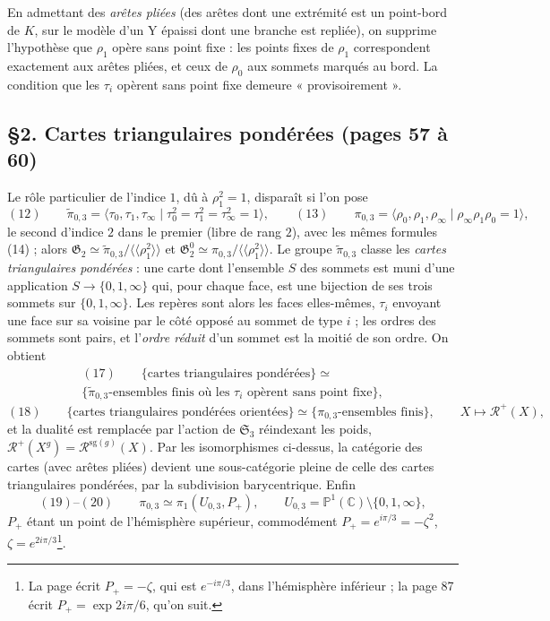 \documentclass[11pt,a4paper]{article}
\begin{document}
En admettant des \emph{arêtes pliées} (des arêtes dont une extrémité est un
point-bord de $K$, sur le modèle d'un Y épaissi dont une branche est repliée),
on supprime l'hypothèse que $\rho_1$ opère sans point fixe : les points fixes
de $\rho_1$ correspondent exactement aux arêtes pliées, et ceux de $\rho_0$ aux
sommets marqués au bord. La condition que les $\tau_i$ opèrent sans point fixe
demeure « provisoirement ».

\subsection*{§2. Cartes triangulaires pondérées (pages 57 à 60)}

Le rôle particulier de l'indice $1$, dû à $\rho_1^2 = 1$, disparaît si l'on
pose
\[
(12)\qquad \tilde\pi_{0,3} = \langle \tau_0, \tau_1, \tau_\infty \mid \tau_0^2 = \tau_1^2 = \tau_\infty^2 = 1 \rangle,
\qquad
(13)\qquad \pi_{0,3} = \langle \rho_0, \rho_1, \rho_\infty \mid \rho_\infty\rho_1\rho_0 = 1 \rangle,
\]
le second d'indice $2$ dans le premier (libre de rang $2$), avec les mêmes
formules (14) ; alors $\mathfrak{G}_2 \simeq \tilde\pi_{0,3}/\langle\langle\rho_1^2\rangle\rangle$
et $\mathfrak{G}^0_2 \simeq \pi_{0,3}/\langle\langle\rho_1^2\rangle\rangle$.
Le groupe $\tilde\pi_{0,3}$ classe les \emph{cartes triangulaires pondérées} :
une carte dont l'ensemble $S$ des sommets est muni d'une application
$S \to \{0, 1, \infty\}$ qui, pour chaque face, est une bijection de ses trois
sommets sur $\{0, 1, \infty\}$. Les repères sont alors les faces elles-mêmes,
$\tau_i$ envoyant une face sur sa voisine par le côté opposé au sommet de type
$i$ ; les ordres des sommets sont pairs, et l'\emph{ordre réduit} d'un sommet
est la moitié de son ordre. On obtient
\[
\begin{gathered}
(17)\qquad \{\text{cartes triangulaires pondérées}\} \simeq \\
\{\tilde\pi_{0,3}\text{-ensembles finis où les } \tau_i \text{ opèrent sans point fixe}\},
\end{gathered}
\]
\[
(18)\qquad \{\text{cartes triangulaires pondérées orientées}\} \simeq \{\pi_{0,3}\text{-ensembles finis}\}, \qquad X \mapsto \mathcal{R}^+(X),
\]
et la dualité est remplacée par l'action de $\mathfrak{S}_3$ réindexant les
poids, $\mathcal{R}^+(X^g) = \mathcal{R}^{\mathrm{sg}(g)}(X)$. Par les
isomorphismes ci-dessus, la catégorie des cartes (avec arêtes pliées) devient
une sous-catégorie pleine de celle des cartes triangulaires pondérées, par la
subdivision barycentrique. Enfin
\[
(19)\text{--}(20)\qquad \pi_{0,3} \simeq \pi_1(U_{0,3}, P_+), \qquad U_{0,3} = \mathbb{P}^1(\mathbb{C}) \setminus \{0, 1, \infty\},
\]
$P_+$ étant un point de l'hémisphère supérieur, commodément
$P_+ = e^{i\pi/3} = -\zeta^2$, $\zeta = e^{2i\pi/3}$\footnote{La page écrit
$P_+ = -\zeta$, qui est $e^{-i\pi/3}$, dans l'hémisphère inférieur ; la page 87
écrit $P_+ = \exp 2i\pi/6$, qu'on suit.}.
\end{document}

